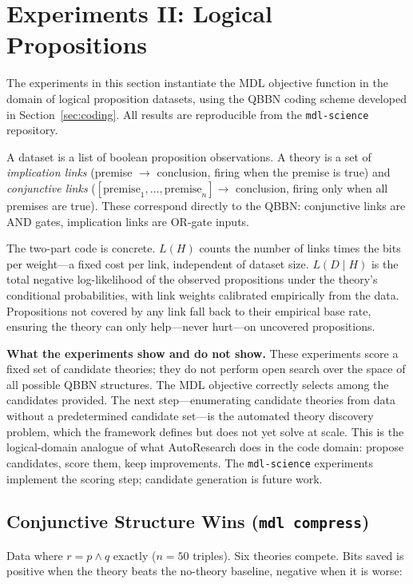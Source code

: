 \section{Experiments II: Logical Propositions}
\label{sec:experiments-logic}

The experiments in this section instantiate the MDL objective function
in the domain of logical proposition datasets, using the QBBN coding
scheme developed in Section~\ref{sec:coding}. All results are
reproducible from the \texttt{mdl-science} repository.

A dataset is a list of boolean proposition observations. A theory is a
set of \emph{implication links} (premise $\to$ conclusion, firing when
the premise is true) and \emph{conjunctive links}
($[\text{premise}_1, \ldots, \text{premise}_n] \to$ conclusion, firing
only when all premises are true). These correspond directly to the
QBBN: conjunctive links are AND gates, implication links are OR-gate
inputs.

The two-part code is concrete. $L(H)$ counts the number of links times
the bits per weight---a fixed cost per link, independent of dataset
size. $L(D \mid H)$ is the total negative log-likelihood of the
observed propositions under the theory's conditional probabilities,
with link weights calibrated empirically from the data. Propositions
not covered by any link fall back to their empirical base rate,
ensuring the theory can only help---never hurt---on uncovered
propositions.

\textbf{What the experiments show and do not show.} These experiments
score a fixed set of candidate theories; they do not perform open
search over the space of all possible QBBN structures. The MDL
objective correctly selects among the candidates provided. The next
step---enumerating candidate theories from data without a
predetermined candidate set---is the automated theory discovery
problem, which the framework defines but does not yet solve at scale.
This is the logical-domain analogue of what AutoResearch does in the
code domain: propose candidates, score them, keep improvements. The
\texttt{mdl-science} experiments implement the scoring step; candidate
generation is future work.

\subsection{Conjunctive Structure Wins (\texttt{mdl compress})}

Data where $r = p \wedge q$ exactly ($n = 50$ triples). Six theories
compete. Bits saved is positive when the theory beats the no-theory
baseline, negative when it is worse:

